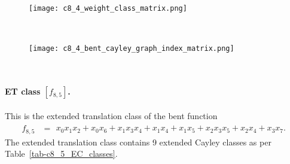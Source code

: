 \documentclass[12pt,a4paper]{article}
\begin{document}
\begin{figure}[!bhpt] %
\centering
\begin{minipage}{.48\textwidth}
  \centering
  \texttt{[image: c8\_4\_weight\_class\_matrix.png]}
  \label{fig:c8_4_weight_class_matrix}
\end{minipage}%
~~~~
\begin{minipage}{.48\textwidth}
  \centering
  \texttt{[image: c8\_4\_bent\_cayley\_graph\_index\_matrix.png]}
  \label{fig:c8_4_bent_cayley_graph_index_matrix}
\end{minipage}
\end{figure}
~
\paragraph*{ET class $[f_{8,5}]$.}
%
This is the extended translation class of the bent function
\small{}
\begin{align*}
f_{ 8 , 5 } &=
\begin{array}{l}
x_{0} x_{1} x_{2} + x_{0} x_{6} + x_{1} x_{3} x_{4} + x_{1} x_{4} + x_{1} x_{5} + x_{2} x_{3} x_{5}
+ x_{2} x_{4} + x_{3} x_{7}.
\end{array}
\end{align*}
\normalsize{}
The extended translation class contains 9 extended Cayley classes as per
Table~\ref{tab-c8_5_EC_classes}.
\end{document}
